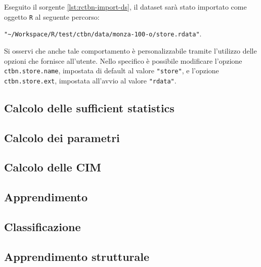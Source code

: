 Eseguito il sorgente \ref{lst:rctbn-import-ds}, il dataset sarà stato importato come oggetto \lstinline$R$ al seguente percorso:

\lstinline[language=rstats]{"~/Workspace/R/test/ctbn/data/monza-100-o/store.rdata"}.

Si osservi che anche tale comportamento è personalizzabile tramite l'utilizzo delle opzioni che \rctbn{} fornisce all'utente. Nello specifico è possibile modificare l'opzione \lstinline$ctbn.store.name$, impostata di default al valore \lstinline[language=rstats]{"store"}, e l'opzione \lstinline$ctbn.store.ext$, impostata all'avvio al valore \lstinline[language=rstats]{"rdata"}.


\subsection{Calcolo delle sufficient statistics}


\subsection{Calcolo dei parametri}


\subsection{Calcolo delle CIM}


\subsection{Apprendimento}

\subsection{Classificazione}

\subsection{Apprendimento strutturale}

